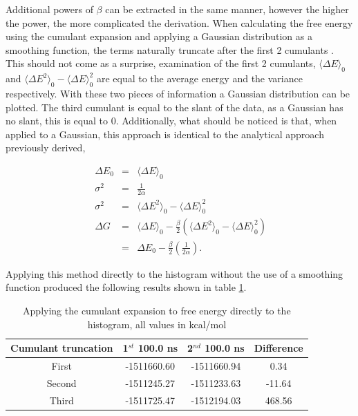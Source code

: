Additional powers of $\beta$ can be extracted in the same manner, however the higher the power, the more complicated the derivation.  When calculating the free energy using the cumulant expansion and applying a Gaussian distribution as a smoothing function, the terms naturally truncate after the first 2 cumulants \cite{cumulant_expansion_cutoff}.  This should not come as a surprise, examination of the first 2 cumulants, $\langle \Delta E \rangle_0$ and $\langle \Delta E^2 \rangle_0 - \langle \Delta E \rangle_0^2$ are equal to the average energy and the variance respectively.  With these two pieces of information a Gaussian distribution can be plotted.  The third cumulant is equal to the slant of the data, as a Gaussian has no slant, this is equal to 0.  Additionally, what should be noticed is that, when applied to a Gaussian, this approach is identical to the analytical approach previously derived,

\begin{eqnarray}
\ \Delta E_0 &=& \langle \Delta E \rangle_0 \\
\ \sigma^2 &=& \frac{1}{2 \alpha} \\
\ \sigma^2 &=& \langle \Delta E^2 \rangle_0 - \langle \Delta E \rangle_0^2 \\
\ \Delta G &=& \langle \Delta E \rangle_0 - \frac{\beta}{2} (\langle \Delta E^2 \rangle_0 - \langle \Delta E \rangle_0^2) \\
\  &=& \Delta E_0 -  \frac{\beta}{2} \left( \frac{1}{2\alpha} \right) .
\end{eqnarray}

Applying this method directly to the histogram without the use of a smoothing function produced the following results shown in table \ref{table:cumulant_free_energy_histogram}. 


\begin{table}[ht]
 \caption{Applying the cumulant expansion to free energy directly to the histogram, all values in kcal/mol}
  \begin{center}
  \begin{tabular}{c|c|c|c}
   \hline\hline
Cumulant truncation & 1$^{st}$ 100.0 ns & 2$^{nd}$ 100.0 ns & Difference \\
 \hline
First & -1511660.60 & -1511660.94 & 0.34 \\
 \hline
Second & -1511245.27 & -1511233.63 & -11.64 \\
 \hline
Third & -1511725.47 & -1512194.03 & 468.56 \\
  \end{tabular}\label{table:cumulant_free_energy_histogram}
 \end{center}
\end{table}

